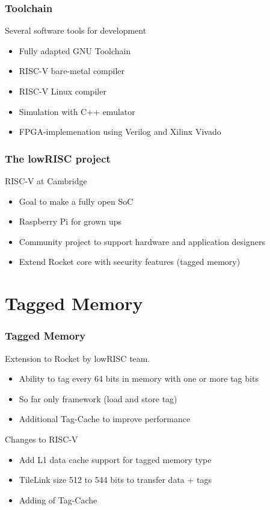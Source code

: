 \documentclass{beamer}
\begin{document}
\begin{frame}
	\frametitle{Toolchain}
	Several software tools for development
	\begin{itemize}
		\item Fully adapted GNU Toolchain
		\item RISC-V bare-metal compiler
		\item RISC-V Linux compiler
		\item Simulation with C++ emulator %
		\item FPGA-implemenation using Verilog and Xilinx Vivado
	\end{itemize}
\end{frame}

\begin{frame}
	\frametitle{The lowRISC project}
		RISC-V at Cambridge 
		\begin{itemize}
		\item Goal to make a fully open SoC 
		\item Raspberry Pi for grown ups
		\item Community project to support hardware and application designers  
		\item Extend Rocket core with security features (tagged memory)
	\end{itemize}
\end{frame}

\section{Tagged Memory}
\begin{frame}
	\frametitle{Tagged Memory}
	Extension to Rocket by lowRISC team.
	\begin{itemize}
		\item Ability to tag every 64 bits in memory with one or more tag bits
		\item So far only framework (load and store tag)
		\item Additional Tag-Cache to improve performance
	\end{itemize}
	Changes to RISC-V
		\begin{itemize}
		\item Add L1 data cache support for tagged memory type
		\item TileLink size 512 to 544 bits to transfer data + tags
		\item Adding of Tag-Cache
	\end{itemize}
\end{frame}
\end{document}

